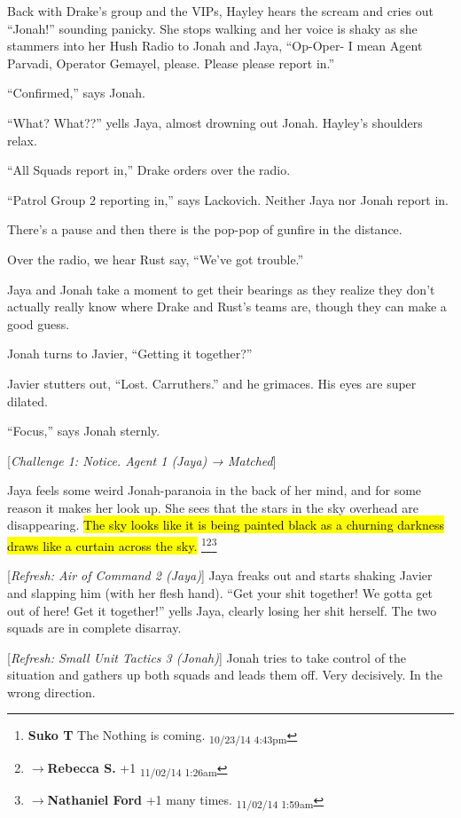 Back with Drake's group and the VIPs, Hayley hears the scream and cries out ``Jonah!'' sounding panicky.   She stops walking and her voice is shaky as she stammers into her Hush Radio to Jonah and Jaya, ``Op-Oper- I mean Agent Parvadi, Operator Gemayel, please.  Please please report in.''

``Confirmed,'' says Jonah.

``What?  What??'' yells Jaya, almost drowning out Jonah.  Hayley's shoulders relax.

``All Squads report in,'' Drake orders over the radio.

``Patrol Group 2 reporting in,'' says Lackovich.  Neither Jaya nor Jonah report in.



There's a pause and then there is the pop-pop of gunfire in the distance.

Over the radio, we hear Rust say, ``We've got trouble.''

Jaya and Jonah take a moment to get their bearings as they realize they don't actually really know where Drake and Rust's teams are, though they can make a good guess.

Jonah turns to Javier, ``Getting it together?''

Javier stutters out, ``Lost.  Carruthers.'' and he grimaces.  His eyes are super dilated.

``Focus,'' says Jonah sternly.

{[}\textit{Challenge 1: Notice.  Agent 1 (Jaya) → Matched}{]}

Jaya feels some weird Jonah-paranoia in the back of her mind, and for some reason it makes her look up.  She sees that the stars in the sky overhead are disappearing.  \hl{The sky looks like it is being painted black as a churning darkness draws like a curtain across the sky.} \footnote{\textbf{Suko T }The Nothing is coming. \textsubscript{10/23/14 4:43pm}}\footnote{$\rightarrow$\textbf{Rebecca S. }+1 \textsubscript{11/02/14 1:26am}}\footnote{$\rightarrow$\textbf{Nathaniel Ford }+1 many times. \textsubscript{11/02/14 1:59am}}

{[}\textit{Refresh: Air of Command 2 (Jaya)}{]}  Jaya freaks out and starts shaking Javier and slapping him (with her flesh hand).  ``Get your shit together!  We gotta get out of here!   Get it together!'' yells Jaya, clearly losing her shit herself. The two squads are in complete disarray.

{[}\textit{Refresh: Small Unit Tactics 3 (Jonah)}{]}  Jonah tries to take control of the situation and gathers up both squads and leads them off. Very decisively.  In the wrong direction.

